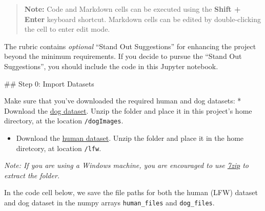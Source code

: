 \documentclass[11pt]{article}
\providecommand{\tightlist}{%
      \setlength{\itemsep}{0pt}\setlength{\parskip}{0pt}}
\begin{document}
\begin{quote}
\textbf{Note:} Code and Markdown cells can be executed using the
\textbf{Shift + Enter} keyboard shortcut. Markdown cells can be edited
by double-clicking the cell to enter edit mode.
\end{quote}

The rubric contains \emph{optional} ``Stand Out Suggestions'' for
enhancing the project beyond the minimum requirements. If you decide to
pursue the ``Stand Out Suggestions'', you should include the code in
this Jupyter notebook.

 \#\# Step 0: Import Datasets

Make sure that you've downloaded the required human and dog datasets: *
Download the
\href{https://s3-us-west-1.amazonaws.com/udacity-aind/dog-project/dogImages.zip}{dog
dataset}. Unzip the folder and place it in this project's home
directory, at the location \texttt{/dogImages}.

\begin{itemize}
\tightlist
\item
  Download the
  \href{https://s3-us-west-1.amazonaws.com/udacity-aind/dog-project/lfw.zip}{human
  dataset}. Unzip the folder and place it in the home diretcory, at
  location \texttt{/lfw}.
\end{itemize}

\emph{Note: If you are using a Windows machine, you are encouraged to
use \href{http://www.7-zip.org/}{7zip} to extract the folder.}

In the code cell below, we save the file paths for both the human (LFW)
dataset and dog dataset in the numpy arrays \texttt{human\_files} and
\texttt{dog\_files}.
\end{document}
